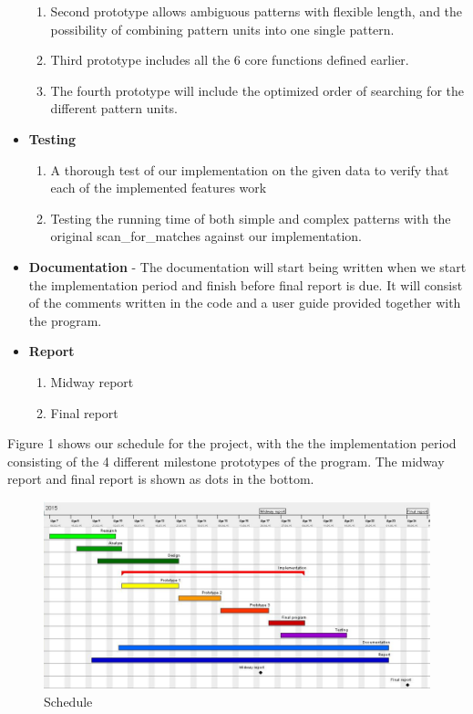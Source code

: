 \documentclass[12pt]{article}
\begin{document}
\begin{itemize}
\begin{enumerate}
\item Second prototype allows ambiguous patterns with flexible length, and the possibility of combining pattern units
into one single pattern.
\item Third prototype includes all the 6 core functions defined earlier.
\item The fourth prototype will include the optimized order of searching for the different pattern units.
\end{enumerate}
\item \textbf{Testing}
\begin{enumerate}
\item A thorough test of our implementation on the given data to verify that each of the implemented features work
\item Testing the running time of both simple and complex patterns with the original scan\_for\_matches against our
implementation.
\end{enumerate}
\item \textbf{Documentation} - The documentation will start being written when we start the implementation period
and finish before final report is due. It will consist of the comments written in the code and a user guide provided 
together with the program.
\item \textbf{Report}
\begin{enumerate}
\item Midway report
\item Final report
\end{enumerate}
\end{itemize}
Figure 1 shows our schedule for the project, with the the implementation period consisting of the 4 different milestone
prototypes of the program. The midway report and final report is shown as dots in the bottom.
\begin{figure}[h!]
\includegraphics[scale=0.7]{gantt.png}
\caption{Schedule}
\end{figure}
\end{document}
